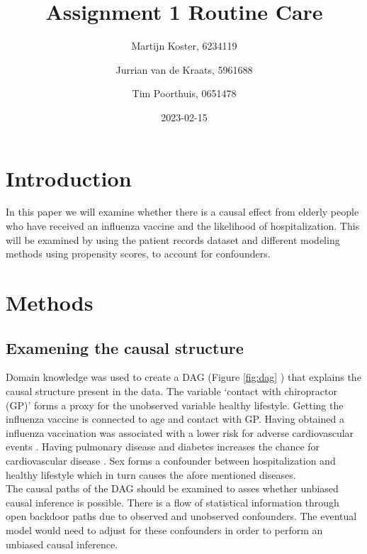 \documentclass[
]{article}
\title{Assignment 1 Routine Care}
\author{Martijn Koster, 6234119 \and Jurrian van de Kraats, 5961688 \and Tim Poorthuis, 0651478}
\date{2023-02-15}
\begin{document}
\maketitle

\newpage

\hypertarget{introduction}{%
\section{Introduction}\label{introduction}}

In this paper we will examine whether there is a causal effect from elderly people who have received an influenza vaccine and the likelihood of hospitalization. This will be examined by using the patient records dataset and different modeling methods using propensity scores, to account for confounders.

\hypertarget{methods}{%
\section{Methods}\label{methods}}

\hypertarget{examening-the-causal-structure}{%
\subsection{Examening the causal structure}\label{examening-the-causal-structure}}

Domain knowledge was used to create a DAG (Figure \ref{fig:dag} ) that explains the causal structure present in the data. The variable `contact with chiropractor (GP)' forms a proxy for the unobserved variable healthy lifestyle. Getting the influenza vaccine is connected to age and contact with GP. Having obtained a influenza vaccination was associated with a lower risk for adverse cardiovascular events \citep{behrouzi}. Having pulmonary disease and diabetes increases the chance for cardiovascular disease \citep{nhg}. Sex forms a confounder between hospitalization and healthy lifestyle \citep{loef} which in turn causes the afore mentioned diseases.\\
\hspace*{0.333em}\hspace*{0.333em}The causal paths of the DAG should be examined to asses whether unbiased causal inference is possible. There is a flow of statistical information through open backdoor paths due to observed and unobserved confounders. The eventual model would need to adjust for these confounders in order to perform an unbiased causal inference.
\end{document}

